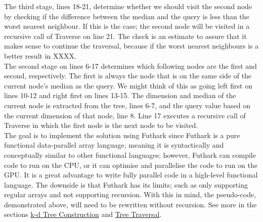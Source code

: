 The third stage, lines 18-21, determine whether we should visit the second node by checking if the difference between the median and the query is less than the worst nearest neighbour. If this is the case; the second node will be visited in a recursive call of Traverse on line 21. The check is an estimate to assure that it makes sense to continue the traversal, because if the worst nearest neighbours is a better result in XXXX. 
~~
\\[2mm]
The second stage on lines 6-17 determines which following nodes are the first and second, respectively. The first is always the node that is on the same side of the current node's median as the query. We might think of this as going left first on lines 10-12 and right first on lines 13-15. The dimension and median of the current node is extracted from the tree, lines 6-7, and the query value based on the current dimension of that node, line 8. Line 17 executes a recursive call of Traverse in which the first node is the next node to be visited.
\\[2mm]
The goal is to implement the solution using Futhark since Futhark is a pure functional data-parallel array language, meaning it is syntactically and conceptually similar to other functional languages; however, Futhark can compile code to run on the CPU, or it can optimise and parallelise the code to run on the GPU. It is a great advantage to write fully parallel code in a high-level functional language. The downside is that Futhark has its limits; such as only supporting regular arrays and not supporting recursion. With this in mind, the pseudo-code, demonstrated above, will need to be rewritten without recursion. See more in the sections \hyperref[sec:kdtree]{k-d Tree Construction} and \hyperref[sec:traversal]{Tree Traversal}.




